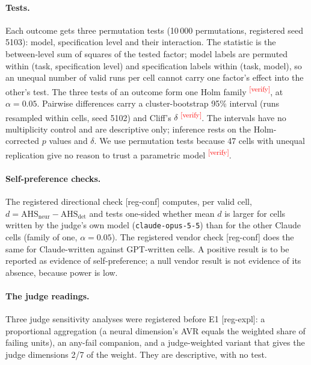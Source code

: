 \documentclass[10pt,a4paper]{article}
\newcommand{\citeneeded}[1]{\cite{#1}\textsuperscript{\textcolor{red}{\tiny[verify]}}}
\newcommand{\regC}{\textsf{\scriptsize[reg-conf]}}  %
\newcommand{\regX}{\textsf{\scriptsize[reg-expl]}}  %
\newcommand{\AHSd}{\mathrm{AHS}_{\mathrm{det}}}
\newcommand{\AHSn}{\mathrm{AHS}_{\mathrm{neur}}}
\begin{document}
\paragraph{Tests.} Each outcome gets three permutation tests (10\,000 permutations, registered seed 5103): model,
specification level and their interaction. The statistic is the between-level sum of squares of the tested factor;
model labels are permuted within (task, specification level) and specification labels within (task, model), so an
unequal number of valid runs per cell cannot carry one factor's effect into the other's test. The three tests of an
outcome form one Holm family \citeneeded{holm1979}, at $\alpha = 0.05$.
Pairwise differences carry a cluster-bootstrap 95\% interval (runs resampled within cells, seed 5102) and Cliff's
$\delta$ \citeneeded{cliff1993}. The intervals have no multiplicity control and are descriptive only; inference
rests on the Holm-corrected $p$ values and $\delta$. %
We use permutation tests because 47 cells with unequal replication give no reason to trust a parametric model
\citeneeded{good2005permutation}.

\paragraph{Self-preference checks.} The registered directional check \regC{} computes, per valid cell,
$d = \AHSn - \AHSd$ and tests one-sided whether mean $d$ is larger for cells written by the judge's own model
(\texttt{claude-opus-5-5}) than for the other Claude cells (family of one, $\alpha = 0.05$). The registered vendor
check \regC{} does the same for Claude-written against GPT-written cells. A positive result is to be reported as
evidence of self-preference; a null vendor result is not evidence of its absence, because power is low.

\paragraph{The judge readings.} Three judge sensitivity analyses were registered before E1 \regX{}: a proportional
aggregation (a neural dimension's AVR equals the weighted share of failing units), an any-fail companion, and a
judge-weighted variant that gives the judge dimensions 2/7 of the weight. They are descriptive, with no test.
\end{document}

